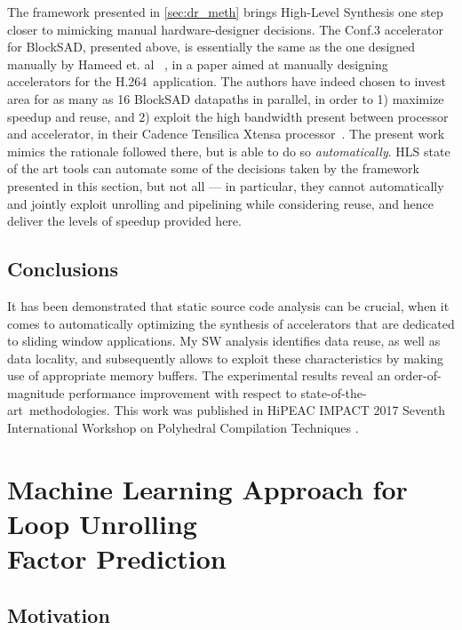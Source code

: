 \documentclass[]{usiinfthesis}
\newcommand{\htsf}{{H.264}}
\newcommand{\SoTA}{{state-of-the-art}}
\begin{document}
The framework presented in \ref{sec:dr_meth} brings High-Level Synthesis
   one step closer to mimicking manual hardware-designer
   decisions. The Conf.3 accelerator for BlockSAD, presented above,
 is essentially the same as the one designed manually by Hameed et. al
 ~\cite{HameedOct11}, in a paper aimed at manually designing
 accelerators for the \htsf\ application. The authors have indeed chosen
 to invest area for as many as 16 BlockSAD datapaths in parallel, in
 order to 1) maximize speedup and reuse, and 2) exploit the high
 bandwidth present between processor and accelerator, in their Cadence
 Tensilica Xtensa processor~\cite{TensilicaWeb}. The present work
 mimics the rationale followed there, but is able to do so
 \emph{automatically}. HLS state of the art tools can automate some of
 the decisions taken by the framework presented in this section, but not 
 all --- in particular,
 they cannot automatically and jointly exploit unrolling and
 pipelining while considering reuse, and hence deliver the levels of
 speedup provided here.


\subsection{Conclusions}

It has been demonstrated that static source code analysis can be crucial, when it comes to 
automatically optimizing the synthesis of accelerators that are dedicated to 
sliding window applications. My SW analysis identifies data reuse, as well as data locality,
and subsequently allows to exploit these characteristics by making use of appropriate
memory buffers. The experimental results reveal an order-of-magnitude performance 
improvement with respect to \SoTA\ methodologies. This work was published in 
HiPEAC IMPACT 2017 Seventh International Workshop on Polyhedral Compilation Techniques 
\cite{ZacharopoulosJan17}. 



%
%
%

\section[Machine Learning Approach for Loop Unrolling\\ Factor Prediction]
{Machine Learning Approach for Loop Unrolling\\ Factor Prediction}

\subsection{Motivation}
\end{document}
